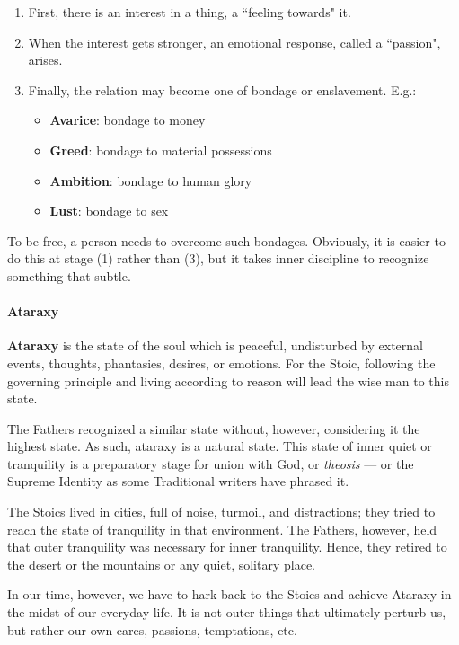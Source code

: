 \begin{enumerate}
\item First, there is an interest in a thing, a ``feeling towards" it. 
\item When the interest gets stronger, an emotional response, called a ``passion", arises. 
\item Finally, the relation may become one of bondage or enslavement. E.g.: 

\begin{itemize}
\item \textbf{Avarice}: bondage to money 
\item \textbf{Greed}: bondage to material possessions 
\item \textbf{Ambition}: bondage to human glory 
\item \textbf{Lust}: bondage to sex 
\end{itemize}
\end{enumerate}
To be free, a person needs to overcome such bondages. Obviously, it is easier to do this at stage (1) rather than (3), but it takes inner discipline to recognize something that subtle.

\paragraph{Ataraxy}
\textbf{Ataraxy} is the state of the soul which is peaceful, undisturbed by external events, thoughts, phantasies, desires, or emotions. For the Stoic, following the governing principle and living according to reason will lead the wise man to this state.

The Fathers recognized a similar state without, however, considering it the highest state. As such, ataraxy is a natural state. This state of inner quiet or tranquility is a preparatory stage for union with God, or \emph{theosis} — or the Supreme Identity as some Traditional writers have phrased it.

The Stoics lived in cities, full of noise, turmoil, and distractions; they tried to reach the state of tranquility in that environment. The Fathers, however, held that outer tranquility was necessary for inner tranquility. Hence, they retired to the desert or the mountains or any quiet, solitary place.

In our time, however, we have to hark back to the Stoics and achieve Ataraxy in the midst of our everyday life. It is not outer things that ultimately perturb us, but rather our own cares, passions, temptations, etc.

